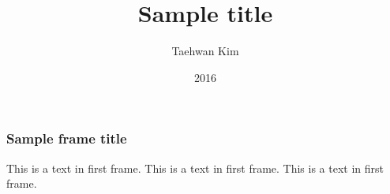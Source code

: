 \documentclass{beamer}
\title{Sample title}
\author{Taehwan Kim}
\institute{UC Berkeley}
\date{2016}
\begin{document}
 
\frame{\titlepage}
 
\begin{frame}
\frametitle{Sample frame title}
This is a text in first frame. This is a text in first frame. This is a text in first frame.
\end{frame}
 
\end{document}
